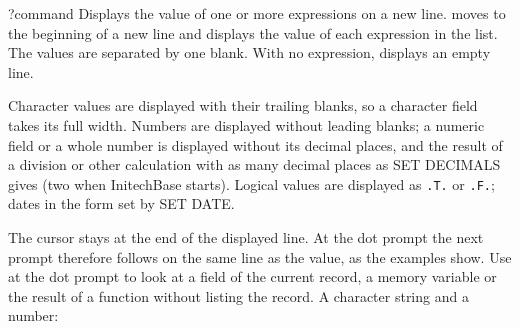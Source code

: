 \begin{XbaseEntry}{?}{command}
Displays the value of one or more expressions on a new line.
\Syntax
{}
\Usage
{} moves to the beginning of a new line and displays the value of each
expression in the list.  The values are separated by one blank.  With no
expression,  displays an empty line.

Character values are displayed with their trailing blanks, so a character
field takes its full width.  Numbers are displayed without leading blanks;
a numeric field or a whole number is displayed without its decimal places,
and the result of a division or other calculation with as many decimal places
as SET DECIMALS gives (two when InitechBase starts).  Logical values are
displayed as \texttt{.T.} or \texttt{.F.}; dates in the form set by SET DATE.

The cursor stays at the end of the displayed line.  At the dot prompt the next
prompt therefore follows on the same line as the value, as the examples show.
\Tips
Use  at the dot prompt to look at a field of the current record, a
memory variable or the result of a function without listing the record.
\Examples
{}
A character string and a number:
\end{XbaseEntry}

